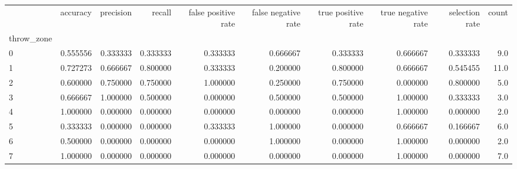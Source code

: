\begin{tabular}{lrrrrrrrrr}
\toprule
{} &  accuracy &  precision &    recall &  false positive rate &  false negative rate &  true positive rate &  true negative rate &  selection rate &  count \\
throw\_zone &           &            &           &                      &                      &                     &                     &                 &        \\
\midrule
0          &  0.555556 &   0.333333 &  0.333333 &             0.333333 &             0.666667 &            0.333333 &            0.666667 &        0.333333 &    9.0 \\
1          &  0.727273 &   0.666667 &  0.800000 &             0.333333 &             0.200000 &            0.800000 &            0.666667 &        0.545455 &   11.0 \\
2          &  0.600000 &   0.750000 &  0.750000 &             1.000000 &             0.250000 &            0.750000 &            0.000000 &        0.800000 &    5.0 \\
3          &  0.666667 &   1.000000 &  0.500000 &             0.000000 &             0.500000 &            0.500000 &            1.000000 &        0.333333 &    3.0 \\
4          &  1.000000 &   0.000000 &  0.000000 &             0.000000 &             0.000000 &            0.000000 &            1.000000 &        0.000000 &    2.0 \\
5          &  0.333333 &   0.000000 &  0.000000 &             0.333333 &             1.000000 &            0.000000 &            0.666667 &        0.166667 &    6.0 \\
6          &  0.500000 &   0.000000 &  0.000000 &             0.000000 &             1.000000 &            0.000000 &            1.000000 &        0.000000 &    2.0 \\
7          &  1.000000 &   0.000000 &  0.000000 &             0.000000 &             0.000000 &            0.000000 &            1.000000 &        0.000000 &    7.0 \\
\bottomrule
\end{tabular}
